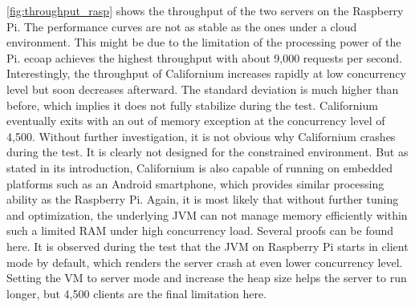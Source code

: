 \autoref{fig:throughput_rasp} shows the throughput of the two servers on the Raspberry Pi. The performance curves are not as stable as the ones under a cloud environment. This might be due to the limitation of the processing power of the Pi. ecoap achieves the highest throughput with about 9,000 requests per second. Interestingly, the throughput of Californium increases rapidly at low concurrency level but soon decreases afterward. The standard deviation is much higher than before, which implies it does not fully stabilize during the test. Californium eventually exits with an out of memory exception at the concurrency level of 4,500. Without further investigation, it is not obvious why Californium crashes during the test. It is clearly not designed for the constrained environment. But as stated in its introduction, Californium is also capable of running on embedded platforms such as an Android smartphone, which provides similar processing ability as the Raspberry Pi. Again, it is most likely that without further tuning and optimization, the underlying JVM can not manage memory efficiently within such a limited RAM under high concurrency load. Several proofs can be found here. It is observed during the test that the JVM on Raspberry Pi starts in client mode by default, which renders the server crash at even lower concurrency level. Setting the VM to server mode and increase the heap size helps the server to run longer, but 4,500 clients are the final limitation here. 

